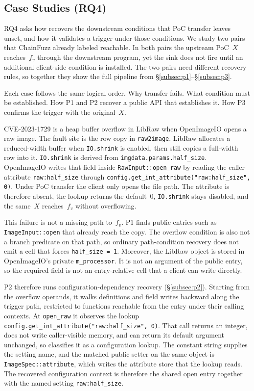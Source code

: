 \subsection{Case Studies (RQ4)}
\label{subsec:rq4}

RQ4 asks how \sys recovers the downstream conditions that PoC transfer leaves unset, and how it validates a trigger under those conditions.
We study two pairs that ChainFuzz already labeled reachable.
In both pairs the upstream PoC~$X$ reaches~$f_v$ through the downstream program, yet the sink does not fire until an additional client-side condition is installed.
The two pairs need different recovery rules, so together they show the full pipeline from \S\ref{subsec:p1}--\S\ref{subsec:p3}.

Each case follows the same logical order.
Why transfer fails.
What condition must be established.
How P1 and P2 recover a public API that establishes it.
How P3 confirms the trigger with the original~$X$.

CVE-2023-1729 is a heap buffer overflow in LibRaw when OpenImageIO opens a raw image.
The fault site is the row copy in \texttt{raw2image}.
LibRaw allocates a reduced-width buffer when \texttt{IO.shrink} is enabled, then still copies a full-width row into it.
\texttt{IO.shrink} is derived from \texttt{imgdata.params.half\_size}.
OpenImageIO writes that field inside \texttt{RawInput::open\_raw} by reading the caller attribute \texttt{raw:half\_size} through \texttt{config.get\_int\_attribute("raw:half\_size", 0)}.
Under PoC transfer the client only opens the file path.
The attribute is therefore absent, the lookup returns the default~0, \texttt{IO.shrink} stays disabled, and the same~$X$ reaches~$f_v$ without overflowing.

This failure is not a missing path to~$f_v$.
P1 finds public entries such as \texttt{ImageInput::open} that already reach the copy.
The overflow condition is also not a branch predicate on that path, so ordinary path-condition recovery does not emit a cell that forces \texttt{half\_size = 1}.
Moreover, the LibRaw object is stored in OpenImageIO's private \texttt{m\_processor}.
It is not an argument of the public entry, so the required field is not an entry-relative cell that a client can write directly.

P2 therefore runs configuration-dependency recovery (\S\ref{subsec:p2}).
Starting from the overflow operands, it walks definitions and field writes backward along the trigger path, restricted to functions reachable from the entry under their calling contexts.
At \texttt{open\_raw} it observes the lookup \texttt{config.get\_int\_attribute("raw:half\_size", 0)}.
That call returns an integer, does not write caller-visible memory, and can return its default argument unchanged, so \sys classifies it as a configuration lookup.
The constant string supplies the setting name, and the matched public setter on the same object is \texttt{ImageSpec::attribute}, which writes the attribute store that the lookup reads.
The recovered configuration context is therefore the shared open entry together with the named setting \texttt{raw:half\_size}.

